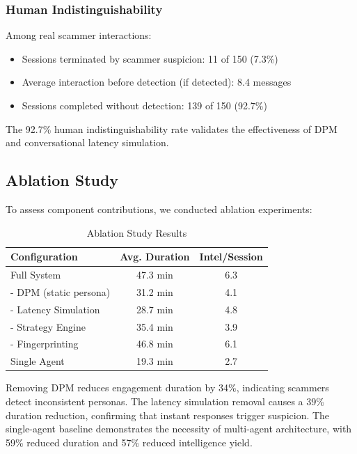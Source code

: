 \documentclass[conference]{IEEEtran}
\begin{document}
\subsubsection{Human Indistinguishability}

Among real scammer interactions:
\begin{itemize}
    \item Sessions terminated by scammer suspicion: 11 of 150 (7.3\%)
    \item Average interaction before detection (if detected): 8.4 messages
    \item Sessions completed without detection: 139 of 150 (92.7\%)
\end{itemize}

The 92.7\% human indistinguishability rate validates the effectiveness of DPM and conversational latency simulation.

\subsection{Ablation Study}

To assess component contributions, we conducted ablation experiments:

\begin{table}[htbp]
\caption{Ablation Study Results}
\label{tab:ablation}
\begin{center}
\begin{tabular}{|l|c|c|}
\hline
\textbf{Configuration} & \textbf{Avg. Duration} & \textbf{Intel/Session} \\
\hline
Full System & 47.3 min & 6.3 \\
\hline
- DPM (static persona) & 31.2 min & 4.1 \\
\hline
- Latency Simulation & 28.7 min & 4.8 \\
\hline
- Strategy Engine & 35.4 min & 3.9 \\
\hline
- Fingerprinting & 46.8 min & 6.1 \\
\hline
Single Agent & 19.3 min & 2.7 \\
\hline
\end{tabular}
\end{center}
\end{table}

Removing DPM reduces engagement duration by 34\%, indicating scammers detect inconsistent personas. The latency simulation removal causes a 39\% duration reduction, confirming that instant responses trigger suspicion. The single-agent baseline demonstrates the necessity of multi-agent architecture, with 59\% reduced duration and 57\% reduced intelligence yield.
\end{document}
